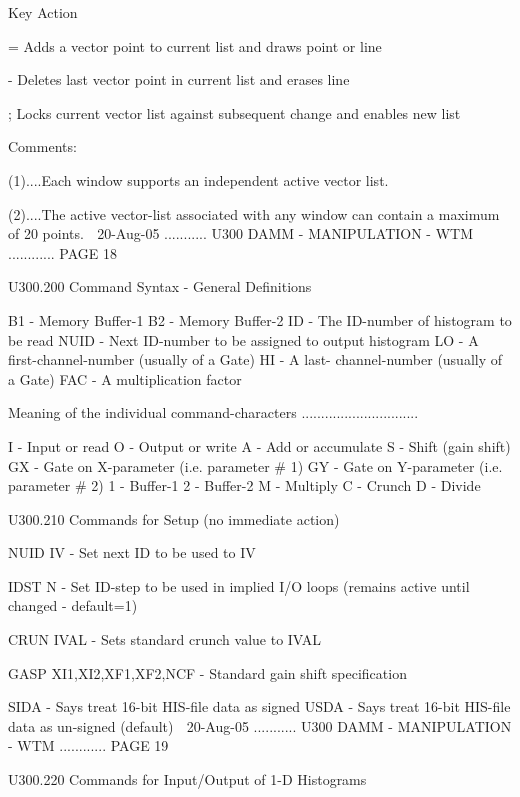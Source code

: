    Key      Action
 
   =        Adds a vector point to current list and draws point or line
 
   -        Deletes last vector point in current list and erases line
 
   ;        Locks current vector list against subsequent change and
            enables new list
 
   Comments:
 
   (1)....Each window supports an independent active vector list.
 
   (2)....The active vector-list associated with  any  window  can  contain  a
          maximum of 20 points.
    
   20-Aug-05 ........... U300  DAMM - MANIPULATION - WTM ............ PAGE  18
 
   U300.200  Command Syntax - General Definitions
 
   B1   - Memory Buffer-1
   B2   - Memory Buffer-2
   ID   - The  ID-number of histogram to be read
   NUID - Next ID-number to be assigned to output histogram
   LO   - A first-channel-number (usually of a Gate)
   HI   - A last- channel-number (usually of a Gate)
   FAC  - A multiplication factor
 
   Meaning of the individual command-characters ..............................
 
   I    - Input  or read
   O    - Output or write
   A    - Add or accumulate
   S    - Shift (gain shift)
   GX   - Gate on X-parameter (i.e. parameter # 1)
   GY   - Gate on Y-parameter (i.e. parameter # 2)
   1    - Buffer-1
   2    - Buffer-2
   M    - Multiply
   C    - Crunch
   D    - Divide
 
   U300.210  Commands for Setup (no immediate action)
 
   NUID IV    - Set next ID to be used to IV
 
   IDST N     - Set ID-step to be used in implied I/O loops
                (remains active until changed - default=1)
 
   CRUN IVAL  - Sets standard crunch value to IVAL
 
   GASP XI1,XI2,XF1,XF2,NCF - Standard gain shift specification
 
   SIDA       - Says treat 16-bit HIS-file data as signed
   USDA       - Says treat 16-bit HIS-file data as un-signed (default)
    
   20-Aug-05 ........... U300  DAMM - MANIPULATION - WTM ............ PAGE  19
 
   U300.220  Commands for Input/Output of 1-D Histograms
 
